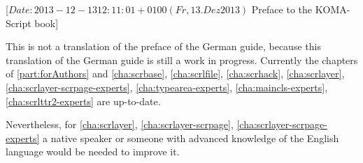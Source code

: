 %
%
%
%
%
%
%
%
%

                 [$Date: 2013-12-13 12:11:01 +0100 (Fr, 13. Dez 2013) $
                  Preface to the KOMA-Script book]



This is not a translation of the preface of the German \KOMAScript{} guide,
because this translation of the German \KOMAScript{} guide is still a work in
progress. Currently the chapters of \autoref{part:forAuthors} and
\autoref{cha:scrbase}, \autoref{cha:scrlfile}, \autoref{cha:scrhack},
\autoref{cha:scrlayer}, \autoref{cha:scrlayer-scrpage-experts},
\autoref{cha:typearea-experts}, \autoref{cha:maincls-experts},
\autoref{cha:scrlttr2-experts} are up-to-date.

Nevertheless, for \autoref{cha:scrlayer}, \autoref{cha:scrlayer-scrpage},
\autoref{cha:scrlayer-scrpage-experts} a native speaker or someone with
advanced knowledge of the English language would be needed to improve it.

